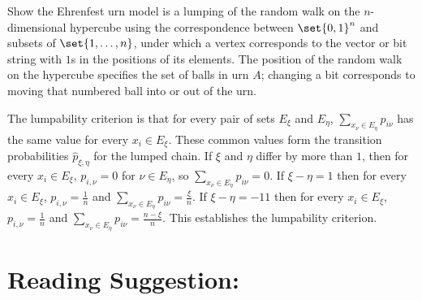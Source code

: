 \documentclass[12pt]{article}
\begin{document}
\begin{exercise}
    Show the Ehrenfest urn model is a lumping of the random walk on the \(
    n \)-dimensional hypercube using the correspondence between \( \set{0,1}^n
    \) and subsets of \( \set{1, \dots, n} \), under which a vertex
    corresponds to the vector or bit string with \( 1 \)s in the
    positions of its elements.  The position of the random walk on the
    hypercube specifies the set of balls in urn \( A \); changing a bit
    corresponds to moving that numbered ball into or out of the urn.
\end{exercise}
\begin{solution}
    The lumpability criterion is that for every pair of sets \( E_{\xi} \)
    and \( E_{\eta} \), \( \sum_{x_{\nu} \in E_{\eta}} p_{i\nu} \) has
    the same value for every \( x_i \in E_{\xi} \). These common values
    form the transition probabilities \( \hat{p}_{\xi,\eta} \) for the
    lumped chain.  If \( \xi \) and \( \eta \) differ by more than \( 1 \),
    then for every \( x_i \in E_{\xi} \), \( p_{i,\nu} = 0 \) for \( \nu
    \in E_{\eta} \), so \( \sum_{x_{\nu} \in E_{\eta}} p_{i\nu} = 0 \).
    If \( \xi - \eta = 1 \) then for every \( x_i \in E_{\xi} \), \( p_{i,\nu}
    = \frac{1}{n} \) and \( \sum_{x_{\nu} \in E_{\eta}} p_{i\nu} = \frac
    {\xi}{n} \).  If \( \xi - \eta = -11 \) then for every \( x_i \in E_
    {\xi} \), \( p_{i,\nu} = \frac{1}{n} \) and \( \sum_{x_{\nu} \in E_{\eta}}
    p_{i\nu} = \frac{n-\xi}{n} \).  This establishes the lumpability
    criterion.
\end{solution}

\hr

\section*{Reading Suggestion:}
\end{document}
